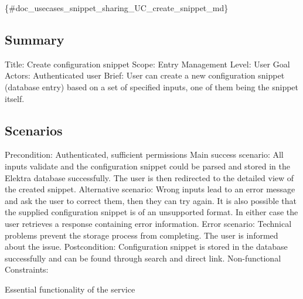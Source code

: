 \{\#doc\+\_\+usecases\+\_\+snippet\+\_\+sharing\+\_\+\+U\+C\+\_\+create\+\_\+snippet\+\_\+md\}

\subsection*{Summary}

Title\+: Create configuration snippet Scope\+: Entry Management Level\+: User Goal Actors\+: Authenticated user Brief\+: User can create a new configuration snippet (database entry) based on a set of specified inputs, one of them being the snippet itself.

\subsection*{Scenarios}

Precondition\+: Authenticated, sufficient permissions Main success scenario\+: All inputs validate and the configuration snippet could be parsed and stored in the Elektra database successfully. The user is then redirected to the detailed view of the created snippet. Alternative scenario\+: Wrong inputs lead to an error message and ask the user to correct them, then they can try again. It is also possible that the supplied configuration snippet is of an unsupported format. In either case the user retrieves a response containing error information. Error scenario\+: Technical problems prevent the storage process from completing. The user is informed about the issue. Postcondition\+: Configuration snippet is stored in the database successfully and can be found through search and direct link. Non-\/functional Constraints\+:
\begin{DoxyItemize}
\item Essential functionality of the service 
\end{DoxyItemize}